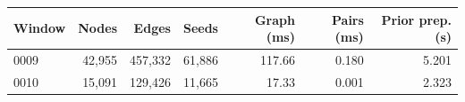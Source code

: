\begin{tabular}{@{}lrrrrrr@{}}
\toprule
Window & Nodes & Edges & Seeds & Graph (ms) & Pairs (ms) & Prior prep. (s) \\
\midrule
0009 & 42,955 & 457,332 & 61,886 & 117.66 & 0.180 & 5.201 \\
0010 & 15,091 & 129,426 & 11,665 & 17.33 & 0.001 & 2.323 \\
\bottomrule
\end{tabular}
